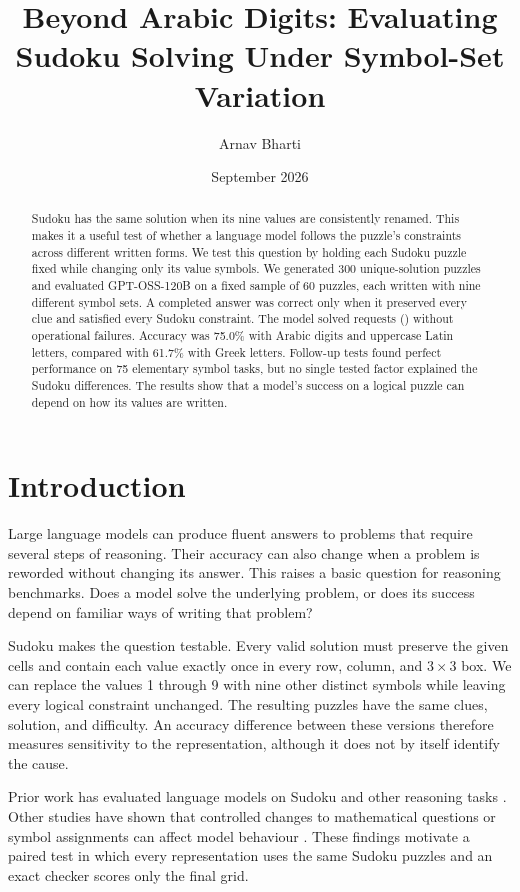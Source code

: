 \documentclass[11pt,a4paper]{article}
\title{Beyond Arabic Digits: Evaluating Sudoku Solving Under Symbol-Set Variation}
\author{Arnav Bharti}
\date{September 2026}
\begin{document}
\maketitle

\begin{abstract}
Sudoku has the same solution when its nine values are consistently renamed. This makes it a useful test of whether a language model follows the puzzle's constraints across different written forms. We test this question by holding each Sudoku puzzle fixed while changing only its value symbols. We generated 300 unique-solution puzzles and evaluated GPT-OSS-120B on a fixed sample of 60 puzzles, each written with nine different symbol sets. A completed answer was correct only when it preserved every clue and satisfied every Sudoku constraint. The model solved \MainCorrect{} requests (\MainAccuracy{}) without operational failures. Accuracy was 75.0\% with Arabic digits and uppercase Latin letters, compared with 61.7\% with Greek letters. Follow-up tests found perfect performance on 75 elementary symbol tasks, but no single tested factor explained the Sudoku differences. The results show that a model's success on a logical puzzle can depend on how its values are written.
\end{abstract}

\section{Introduction}
Large language models can produce fluent answers to problems that require several steps of reasoning. Their accuracy can also change when a problem is reworded without changing its answer. This raises a basic question for reasoning benchmarks. Does a model solve the underlying problem, or does its success depend on familiar ways of writing that problem?

Sudoku makes the question testable. Every valid solution must preserve the given cells and contain each value exactly once in every row, column, and $3\times3$ box. We can replace the values 1 through 9 with nine other distinct symbols while leaving every logical constraint unchanged. The resulting puzzles have the same clues, solution, and difficulty. An accuracy difference between these versions therefore measures sensitivity to the representation, although it does not by itself identify the cause.

Prior work has evaluated language models on Sudoku and other reasoning tasks \citep{seely2025sudokubench,shah2024causal}. Other studies have shown that controlled changes to mathematical questions or symbol assignments can affect model behaviour \citep{mirzadeh2025gsmsymbolic,wei2023symbol}. These findings motivate a paired test in which every representation uses the same Sudoku puzzles and an exact checker scores only the final grid.
\end{document}
